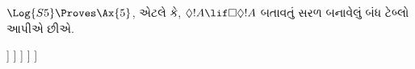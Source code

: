 \documentclass[../../../include/open-logic-section]{subfiles}
\begin{document}
\begin{ex}
  $\Log{S5} \Proves \Ax{5}$, એટલે કે,
  $\Diamond!A \lif \Box\Diamond!A$ બતાવતું સરળ બનાવેલું બંધ
  ટેબ્લો આપીએ છીએ.
  \begin{oltableau}
    [\pFmla{\False}{\Diamond\formula{A} \lif \Box\Diamond \formula{A}}{1},
      just = \TAss
      [\pFmla{\True}{\Diamond \formula{A}}{1}, just = {\TRule{\False}{\lif}[1]}
        [\pFmla{\False}{\Box\Diamond \formula{A}}{1},
          just = {\TRule{\False}{\lif}[1]}
          [\pFmla{\False}{\Diamond \formula{A}}{2},
            just = {\TRule{\False}{\Box}[3]}
            [\pFmla{\True}{\formula{A}}{3},
              just = {\TRule{\True}{\Diamond}[2]}
                [\pFmla{\False}{\formula{A}}{3},
                  just = {\TRule{\False}{\Diamond}[4]}, close]
            ]
          ]
        ]
      ]
    ]
  \end{oltableau}
\end{ex}
\end{document}
